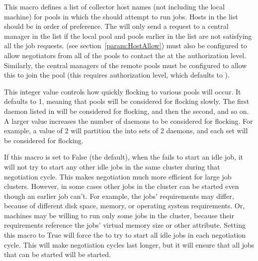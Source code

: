 \begin{description}
\label{param:FlockCollectorHosts}
\item[\Macro{FLOCK\_COLLECTOR\_HOSTS}]
  This macro defines a list of collector host names (not including the
  local  machine) for pools in which the
   should attempt to run jobs.  Hosts in the list
  should be in order of preference.  The  will only
  send a request to a central manager in the list if the local pool
  and pools earlier in the list are not satisfying all the job
  requests.   (see
  section~\ref{param:HostAllow}) must also be configured to allow
  negotiators from all of the pools to contact the  at
  the  authorization level.  Similarly, the central
  managers of the remote pools must be configured to allow this
   to join the pool (this requires 
  authorization level, which defaults to ).

\label{param:FlockIncrement}
\item[\Macro{FLOCK\_INCREMENT}]
  This integer value controls how quickly flocking to various
  pools will occur.  It defaults to 1, meaning that pools will
  be considered for flocking slowly. 
  The first  daemon listed in
   will be considered for flocking, and then
  the second, and so on.  A larger value increases the number of 
   daemons to be considered for flocking.
  For example, a value of 2 will partition the
   into sets of 2  daemons,
  and each set will be considered for flocking.

  \label{param:NegotiateAllJobsInCluster}
\item[\Macro{NEGOTIATE\_ALL\_JOBS\_IN\_CLUSTER}]
  If this macro is set to False (the default), when the  fails
  to start an idle job, it will not try to start any other
  idle jobs in the same cluster during that negotiation cycle.  This
  makes negotiation much more efficient for large job clusters.
  However, in some cases other jobs in the cluster can be started even
  though an earlier job can't.  For example, the jobs' requirements
  may differ, because of different disk space, memory, or
  operating system requirements.  Or, machines may be willing to run
  only some jobs in the cluster, because their requirements reference
  the jobs' virtual memory size or other attribute.  Setting this
  macro to True will force the  to try to start all idle jobs in
  each negotiation cycle.  This will make negotiation cycles last
  longer, but it will ensure that all jobs that can be started will be
  started.


\end{description}
